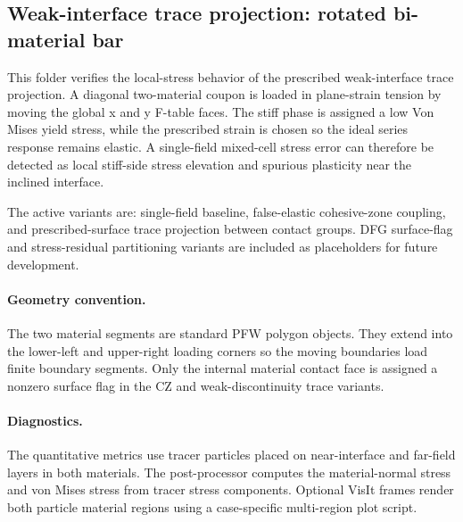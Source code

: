 \subsection{Weak-interface trace projection: rotated bi-material bar}
\label{sec:weakTraceRotatedBar}

This folder verifies the local-stress behavior of the prescribed weak-interface
trace projection.  A diagonal two-material coupon is loaded in plane-strain
tension by moving the global x and y F-table faces.  The stiff phase is assigned
a low Von Mises yield stress, while the prescribed strain is chosen so the ideal
series response remains elastic.  A single-field mixed-cell stress error can
therefore be detected as local stiff-side stress elevation and spurious
plasticity near the inclined interface.

The active variants are: single-field baseline, false-elastic cohesive-zone
coupling, and prescribed-surface trace projection between contact groups.  DFG
surface-flag and stress-residual partitioning variants are included as
placeholders for future development.

\paragraph{Geometry convention.}  The two material segments are standard PFW
polygon objects.  They extend into the lower-left and upper-right loading
corners so the moving boundaries load finite boundary segments.  Only the
internal material contact face is assigned a nonzero surface flag in the CZ and
weak-discontinuity trace variants.

\paragraph{Diagnostics.}  The quantitative metrics use tracer particles placed
on near-interface and far-field layers in both materials.  The post-processor
computes the material-normal stress and von Mises stress from tracer stress
components.  Optional VisIt frames render both particle material regions using a
case-specific multi-region plot script.


